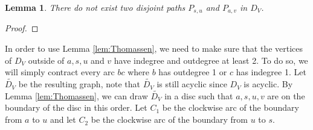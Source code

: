 \documentclass[utf8,11pt]{article}
\theoremstyle{plain}
\newtheorem{lemma}[theorem]{Lemma}
\theoremstyle{definition}
\begin{document}
\begin{lemma}
    There do not exist two disjoint paths $P_{s,u}$ and $P_{a,v}$ in $D_V$.
\end{lemma}

\begin{proof}
    
\end{proof}

In order to use Lemma \ref{lem:Thomassen}, we need to make sure that the vertices of $D_V$ outside of $a,s,u$ and $v$ have indegree and outdegree at least 2. To do so, we will simply contract every arc $bc$ where $b$ has outdegree 1 or $c$ has indegree 1. Let $\tilde{D_V}$ be the resulting graph,  note that $\tilde{D_V}$ is still acyclic since $D_V$ is acyclic. By Lemma \ref{lem:Thomassen}, we can draw $\tilde{D_V}$ in a disc such that $a,s,u,v$ are on the boundary of the disc in this order. Let $C_1$ be the clockwise arc of the boundary from $a$ to $u$ and let $C_2$ be the clockwise arc of the boundary from $u$ to $s$. 
\end{document}
